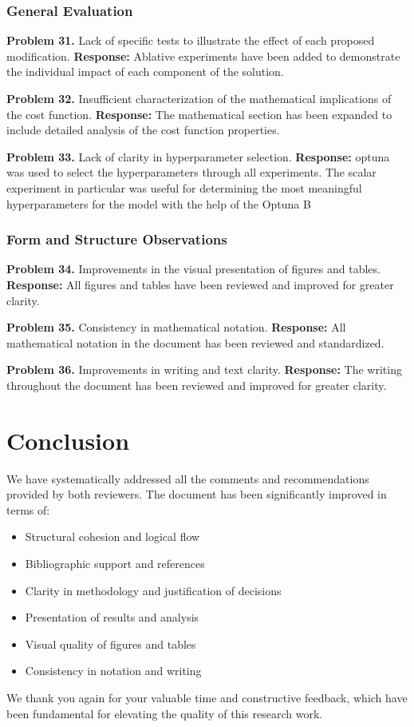 \documentclass[12pt,a4paper]{article}
\begin{document}
\subsubsection*{General Evaluation}

\textbf{Problem 31.} Lack of specific tests to illustrate the
effect of each proposed modification.
\textbf{Response:} Ablative experiments have been added to
demonstrate the individual impact of each component of the solution.

\textbf{Problem 32.} Insufficient characterization of the
mathematical implications of the cost function.
\textbf{Response:} The mathematical section has been expanded to
include detailed analysis of the cost function properties.

\textbf{Problem 33.} Lack of clarity in hyperparameter selection.
\textbf{Response:} optuna was used to select the hyperparameters through all
experiments. The scalar experiment in particular was useful for determining the
most meaningful hyperparameters for the model with the help of the Optuna B

\subsubsection*{Form and Structure Observations}

\textbf{Problem 34.} Improvements in the visual presentation of
figures and tables.
\textbf{Response:} All figures and tables have been reviewed and
improved for greater clarity.

\textbf{Problem 35.} Consistency in mathematical notation.
\textbf{Response:} All mathematical notation in the document has been
reviewed and standardized.

\textbf{Problem 36.} Improvements in writing and text clarity.
\textbf{Response:} The writing throughout the document has been
reviewed and improved for greater clarity.

\section*{Conclusion}

We have systematically addressed all the comments and
recommendations provided by both reviewers. The document has
been significantly improved in terms of:

\begin{itemize}
  \item Structural cohesion and logical flow
  \item Bibliographic support and references
  \item Clarity in methodology and justification of decisions
  \item Presentation of results and analysis
  \item Visual quality of figures and tables
  \item Consistency in notation and writing
\end{itemize}

We thank you again for your valuable time and constructive feedback,
which have been fundamental for elevating the quality of
this research work.
\end{document}
